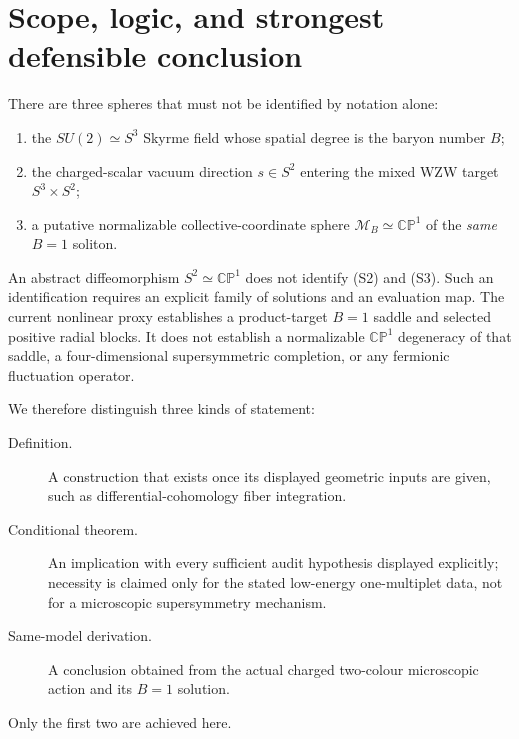 \documentclass[11pt]{article}
\theoremstyle{definition}
\theoremstyle{remark}
\newcommand{\ZZ}{\mathbb Z}
\newcommand{\CP}{\mathbb {CP}}
\newcommand{\cO}{\mathcal O}
\newcommand{\cL}{\mathcal L}
\newcommand{\cM}{\mathcal M}
\newcommand{\cC}{\mathcal C}
\begin{document}
\begin{abstract}
Finally, the degree-five mixed-WZW character is correctly transgressed along
the spatial three-cycle,
\[
 \widehat\cL_B=\int_{\Sigma_3}\operatorname{ev}^*\widehat\Omega_5
 \in\widehat H^2(\widetilde\cC_B;\ZZ).
\]
After an equivariant differential refinement and globally trivial vertical
holonomy establish gauge-basic descent, its pullback to the same soliton
moduli sphere is \(\cO(+2)\) exactly when
\(\int_{\Sigma_3\times\CP^1}\operatorname{ev}^*c(\widehat\Omega_5)=2\).
The factorized conditional map gives \(nB\deg(s)=2\), but the present proxy
has not identified its scalar \(S^2\) with the soliton collective sphere and
has not proved equivariant descent.  The AP-E3/AP-E4 composition gate and the
degree-one Route-E portal therefore remain closed.
\end{abstract}

\tableofcontents

\section{Scope, logic, and strongest defensible conclusion}

There are three spheres that must not be identified by notation alone:
\begin{enumerate}[label=(S\arabic*)]
\item the \(SU(2)\simeq S^3\) Skyrme field whose spatial degree is the
  baryon number \(B\);
\item the charged-scalar vacuum direction \(s\in S^2\) entering the mixed
  WZW target \(S^3\times S^2\);
\item a putative normalizable collective-coordinate sphere
  \(\cM_B\simeq\CP^1\) of the \emph{same} \(B=1\) soliton.
\end{enumerate}
An abstract diffeomorphism \(S^2\simeq\CP^1\) does not identify (S2) and
(S3).  Such an identification requires an explicit family of solutions and
an evaluation map.  The current nonlinear proxy establishes a product-target
\(B=1\) saddle and selected positive radial blocks.  It does not establish a
normalizable \(\CP^1\) degeneracy of that saddle, a four-dimensional
supersymmetric completion, or any fermionic fluctuation operator.

We therefore distinguish three kinds of statement:
\begin{description}
\item[Definition.] A construction that exists once its displayed geometric
  inputs are given, such as differential-cohomology fiber integration.
\item[Conditional theorem.] An implication with every sufficient audit
  hypothesis displayed explicitly; necessity is claimed only for the stated
  low-energy one-multiplet data, not for a microscopic supersymmetry mechanism.
\item[Same-model derivation.] A conclusion obtained from the actual charged
  two-colour microscopic action and its \(B=1\) solution.
\end{description}
Only the first two are achieved here.
\end{document}
